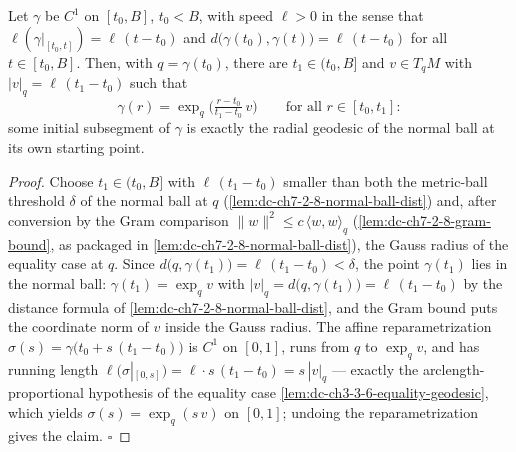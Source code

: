 \begin{lemma}
  \label{lem:dc-ch3-3-9-anchored}
  \leanok
  Let $\gamma$ be $C^1$ on $[t_0,B]$, $t_0<B$, with speed $\ell>0$ in the
  sense that $\ell(\gamma|_{[t_0,t]})=\ell\,(t-t_0)$ and
  $d\big(\gamma(t_0),\gamma(t)\big)=\ell\,(t-t_0)$ for all $t\in[t_0,B]$.
  Then, with $q=\gamma(t_0)$, there are $t_1\in(t_0,B]$ and $v\in T_qM$ with
  $|v|_q=\ell\,(t_1-t_0)$ such that
  $$\gamma(r)=\exp_q\Big(\tfrac{r-t_0}{t_1-t_0}\,v\Big)
    \qquad\text{for all } r\in[t_0,t_1]:$$
  some initial subsegment of $\gamma$ is exactly the radial geodesic of the
  normal ball at its own starting point.
\end{lemma}
\begin{proof}
  \leanok
  Choose $t_1\in(t_0,B]$ with $\ell\,(t_1-t_0)$ smaller than both the
  metric-ball threshold $\delta$ of the normal ball at $q$
  (\cref{lem:dc-ch7-2-8-normal-ball-dist}) and, after conversion by the Gram
  comparison $\|w\|^2\le c\,\langle w,w\rangle_q$
  (\cref{lem:dc-ch7-2-8-gram-bound}, as packaged in
  \cref{lem:dc-ch7-2-8-normal-ball-dist}), the Gauss radius of the equality
  case at $q$. Since $d\big(q,\gamma(t_1)\big)=\ell\,(t_1-t_0)<\delta$, the point
  $\gamma(t_1)$ lies in the normal ball: $\gamma(t_1)=\exp_q v$ with
  $|v|_q=d\big(q,\gamma(t_1)\big)=\ell\,(t_1-t_0)$ by the distance formula
  of \cref{lem:dc-ch7-2-8-normal-ball-dist}, and the Gram bound puts the
  coordinate norm of $v$ inside the Gauss radius. The affine
  reparametrization $\sigma(s)=\gamma\big(t_0+s\,(t_1-t_0)\big)$ is $C^1$ on
  $[0,1]$, runs from $q$ to $\exp_q v$, and has running length
  $\ell(\sigma|_{[0,s]})=\ell\cdot s\,(t_1-t_0)=s\,|v|_q$ — exactly the
  arclength-proportional hypothesis of the equality case
  \cref{lem:dc-ch3-3-6-equality-geodesic}, which yields
  $\sigma(s)=\exp_q(s\,v)$ on $[0,1]$; undoing the reparametrization gives
  the claim. $\square$
\end{proof}

